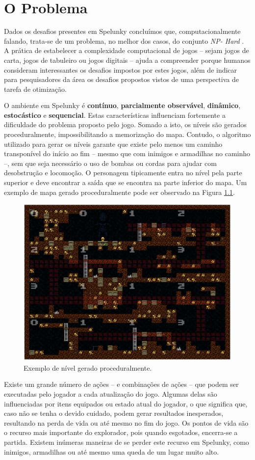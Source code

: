 \chapter{\label{chap:problem}O Problema}
Dados os desafios presentes em Spelunky concluímos que, computacionalmente
falando, trata-se de um problema, no melhor dos casos, do conjunto \textit{NP-
Hard} \cite{SPELUNKYHARD}. A prática de estabelecer a complexidade computacional
de jogos -- sejam jogos de carta, jogos de tabuleiro ou jogos digitais -- ajuda
a compreender  porque humanos consideram interessantes os desafios impostos por
estes jogos, além de indicar para pesquisadores da área os desafios propostos
vistos de uma perspectiva de tarefa de otimização.

O ambiente em Spelunky é \textbf{contínuo}, \textbf{parcialmente observável},
\textbf{dinâmico}, \textbf{estocástico} e \textbf{sequencial}. Estas
características influenciam fortemente a dificuldade do problema proposto pelo
jogo. Somado a isto, os níveis são gerados proceduralmente, impossibilitando a
memorização do mapa. Contudo, o algoritmo utilizado para gerar os níveis garante
que existe pelo menos um caminho transponível do início ao fim -- mesmo que com
inimigos e armadilhas no caminho --, sem que seja necessário o uso de bombas ou
cordas para ajudar com desobstrução e locomoção. O personagem tipicamente entra
no nível pela parte superior e deve encontrar a saída que se encontra na parte
inferior do mapa. Um exemplo de mapa gerado proceduralmente pode ser observado
na Figura \ref{fig:spelunky-level-example}.

\begin{figure}[htb!]
\centering\includegraphics[width=.65\textwidth]{fig/spelunky-level-example.png}
\caption {\label{fig:spelunky-level-example}Exemplo de nível gerado
proceduralmente.} \end{figure}

Existe um grande número de ações -- e combinações de ações -- que podem ser
executadas pelo jogador a cada atualização do jogo. Algumas delas são
influenciadas por itens equipados ou estado atual do jogador, o que significa
que, caso não se tenha o devido cuidado, podem gerar resultados inesperados,
resultando na perda de vida ou até mesmo no fim do jogo. Os pontos de vida são o
recurso mais importante do explorador, pois quando esgotados, encerra-se a
partida. Existem inúmeras maneiras de se perder este recurso em Spelunky, como
inimigos, armadilhas ou até mesmo uma queda de um lugar muito alto.

